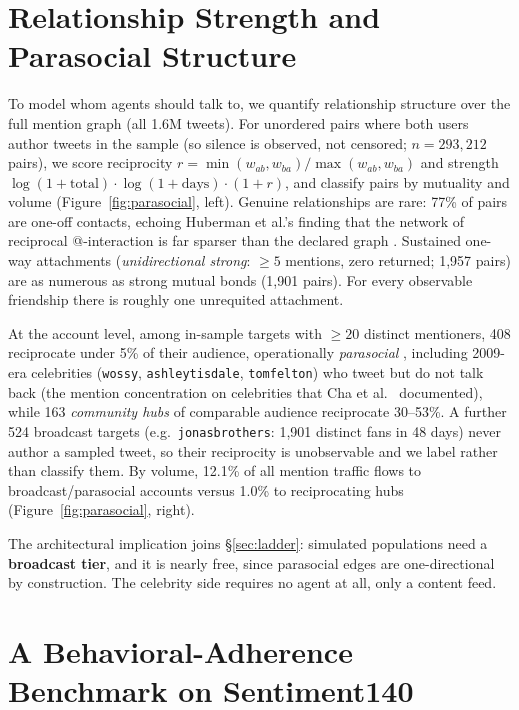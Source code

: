 \documentclass[twocolumn,10pt]{article}
\makeatletter
\newcommand{\paperurlof}[1]{\csname paperurl@#1\endcsname}
\newcommand{\ecite}[1]{\href{\paperurlof{#1}}{\NoHyper\cite{#1}\endNoHyper}}
\makeatother
\begin{document}
\section{Relationship Strength and Parasocial Structure}
\label{sec:parasocial}

To model whom agents should talk to, we quantify relationship structure over
the full mention graph (all 1.6M tweets). For unordered pairs where both users
author tweets in the sample (so silence is observed, not censored;
$n=293{,}212$ pairs), we score reciprocity $r=\min(w_{ab},w_{ba})/\max(w_{ab},w_{ba})$
and strength $\log(1{+}\text{total})\cdot\log(1{+}\text{days})\cdot(1{+}r)$,
and classify pairs by mutuality and volume (Figure~\ref{fig:parasocial},
left). Genuine relationships are rare: 77\% of pairs are one-off contacts,
echoing Huberman et al.'s finding that the network of reciprocal
@-interaction is far sparser than the declared graph \ecite{huberman2009}.
Sustained one-way attachments (\emph{unidirectional strong}:
$\geq 5$ mentions, zero returned; 1{,}957 pairs) are as numerous as strong
mutual bonds (1{,}901 pairs). For every observable friendship there is
roughly one unrequited attachment.

At the account level, among in-sample targets with $\geq 20$ distinct
mentioners, 408 reciprocate under 5\% of their audience, operationally
\emph{parasocial}
\ecite{horton1956},
including 2009-era celebrities
(\texttt{wossy}, \texttt{ashleytisdale}, \texttt{tomfelton}) who tweet but do
not talk back (the mention concentration on celebrities that Cha et al.\
\ecite{cha2010} documented), while 163 \emph{community hubs} of comparable audience
reciprocate 30--53\%. A further 524 broadcast targets (e.g.\
\texttt{jonasbrothers}: 1{,}901 distinct fans in 48 days) never author a
sampled tweet, so their reciprocity is unobservable and we label rather than
classify them. By volume, 12.1\% of all mention traffic flows to
broadcast/parasocial accounts versus 1.0\% to reciprocating hubs
(Figure~\ref{fig:parasocial}, right).

The architectural implication joins \S\ref{sec:ladder}: simulated populations
need a \textbf{broadcast tier}, and it is nearly free, since parasocial
edges are one-directional by construction. The celebrity side requires no
agent at all, only a content feed.









\section{A Behavioral-Adherence Benchmark on Sentiment140}
\label{sec:benchmark}
\end{document}
